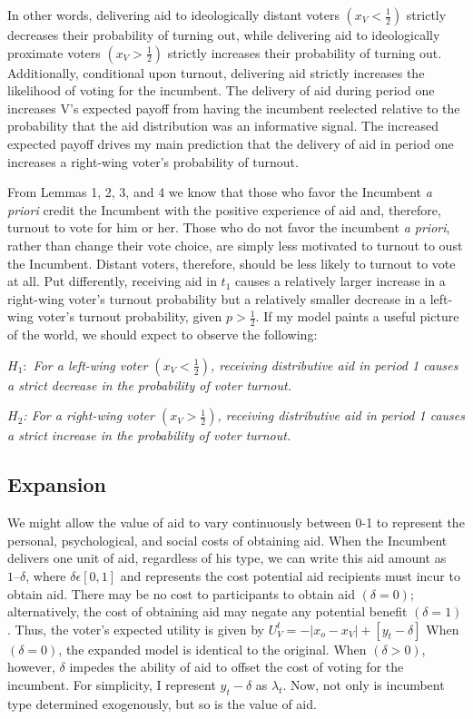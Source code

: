 \documentclass[12pt]{paper}
\begin{document}
In other words, delivering aid to ideologically distant voters $(x_V < \frac{1}{2})$ strictly decreases their probability of turning out, while delivering aid to ideologically proximate voters $(x_V > \frac{1}{2})$  strictly increases their probability of turning out. Additionally, conditional upon turnout, delivering aid strictly increases the likelihood of voting for the incumbent. The delivery of aid during period one increases V’s expected payoff from having the incumbent reelected relative to the probability that the aid distribution was an informative signal. The increased expected payoff drives my main prediction that the delivery of aid in period one increases a right-wing voter's probability of turnout.

From Lemmas 1, 2, 3, and 4 we know that those who favor the Incumbent \emph{a priori} credit the Incumbent with the positive experience of aid and, therefore, turnout to vote for him or her. Those who do not favor the incumbent \emph{a priori}, rather than change their vote choice, are simply less motivated to turnout to oust the Incumbent. Distant voters, therefore, should be less likely to turnout to vote at all. Put differently, receiving aid in $t_1$ causes a relatively larger increase in a right-wing voter’s turnout probability but a relatively smaller decrease in a left-wing voter’s turnout probability, given $p > \frac{1}{2}$. If my model paints a useful picture of the world, we should expect to observe the following:

\emph{$H_1:$ For a left-wing voter $(x_V < \frac{1}{2})$, receiving distributive aid in period 1 causes a strict decrease in the probability of voter turnout.}

\emph{$H_2$: For a right-wing voter $(x_V > \frac{1}{2})$, receiving distributive aid in period 1 causes a strict increase in the probability of voter turnout.}

\subsection{Expansion}
We might allow the value of aid to vary continuously between 0-1 to represent the personal, psychological, and social costs of obtaining aid. When the Incumbent delivers one unit of aid, regardless of his type, we can write this aid amount as $1 – \delta$, where $\delta \epsilon [0,1]$ and represents the cost potential aid recipients must incur to obtain aid. There may be no cost to participants to obtain aid $(\delta = 0)$; alternatively, the cost of obtaining aid may negate any potential benefit $(\delta = 1)$. Thus, the voter’s expected utility is given by $U_{V}^t = -|x_o - x_V| + [y_t - \delta]$ When $(\delta = 0)$, the expanded model is identical to the original. When $(\delta > 0)$, however, $\delta$ impedes the ability of aid to offset the cost of voting for the incumbent. For simplicity, I represent $y_t - \delta$ as  $\lambda_t$. Now, not only is incumbent type determined exogenously, but so is the value of aid.
\end{document}
